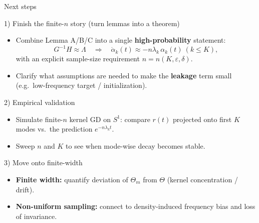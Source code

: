 \documentclass[10pt,aspectratio=169]{beamer}
\begin{document}
\begin{frame}{Next steps}
	\small
	\begin{block}{1) Finish the finite-$n$ story (turn lemmas into a theorem)}
		\begin{itemize}
			\item Combine Lemma A/B/C into a single \textbf{high-probability} statement:
			      \[
				      G^{-1}H \approx \Lambda
				      \quad\Rightarrow\quad
				      \dot\alpha_k(t)\approx -n\lambda_k\,\alpha_k(t)\ (k\le K),
			      \]
			      with an explicit sample-size requirement $n=n(K,\varepsilon,\delta)$.
			\item Clarify what assumptions are needed to make the \textbf{leakage} term small (e.g.\ low-frequency target / initialization).
		\end{itemize}
	\end{block}

	\begin{block}{2) Empirical validation}
		\begin{itemize}
			\item Simulate finite-$n$ kernel GD on $S^1$:
			      compare $r(t)$ projected onto first $K$ modes vs.\ the prediction $e^{-n\lambda_k t}$.
			\item Sweep $n$ and $K$ to see when mode-wise decay becomes stable.
		\end{itemize}
	\end{block}

	\begin{block}{3) Move onto finite-width}
		\begin{itemize}
			\item \textbf{Finite width:} quantify deviation of $\Theta_m$ from $\Theta$ (kernel concentration / drift).
			\item \textbf{Non-uniform sampling:} connect to density-induced frequency bias and loss of invariance.
		\end{itemize}
	\end{block}

\end{frame}
\end{document}
